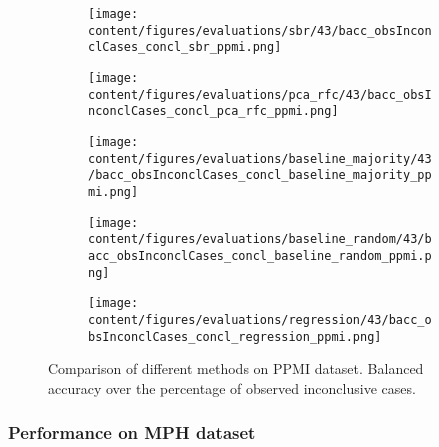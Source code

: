 \begin{figure}[ht]
  \begin{subfigure}{0.5\textwidth}
    \centering
    \texttt{[image: content/figures/evaluations/sbr/43/bacc\_obsInconclCases\_concl\_sbr\_ppmi.png]}
  \end{subfigure}
  \hfill
  \begin{subfigure}{0.5\textwidth}
    \centering
    \texttt{[image: content/figures/evaluations/pca\_rfc/43/bacc\_obsInconclCases\_concl\_pca\_rfc\_ppmi.png]}
  \end{subfigure}
  \hfill
  \begin{subfigure}{0.5\textwidth}
    \centering
    \texttt{[image: content/figures/evaluations/baseline\_majority/43/bacc\_obsInconclCases\_concl\_baseline\_majority\_ppmi.png]}
  \end{subfigure}
  \hfill
  \begin{subfigure}{0.5\textwidth}
    \centering
    \texttt{[image: content/figures/evaluations/baseline\_random/43/bacc\_obsInconclCases\_concl\_baseline\_random\_ppmi.png]}
  \end{subfigure}
  \hfill
  \begin{subfigure}{0.5\textwidth}
    \centering
    \texttt{[image: content/figures/evaluations/regression/43/bacc\_obsInconclCases\_concl\_regression\_ppmi.png]}
  \end{subfigure}

  \caption{Comparison of different methods on PPMI dataset. 
  Balanced accuracy over the percentage of observed inconclusive cases.}
  \label{fig:test_ppmi}
\end{figure}



\subsubsection{Performance on MPH dataset}

